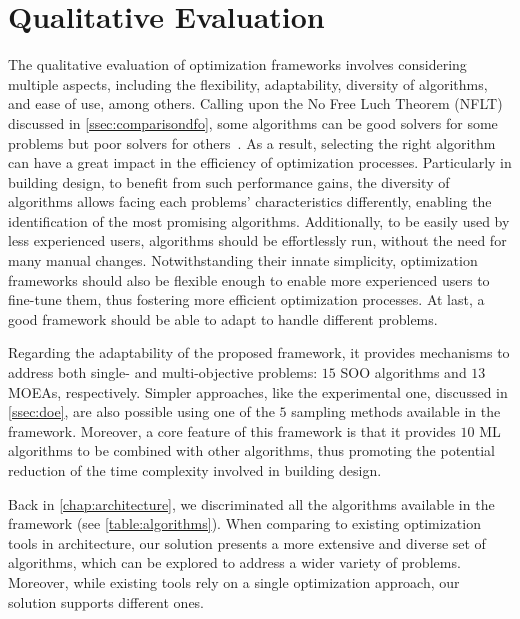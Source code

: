 \section{Qualitative Evaluation}
\label{sec:qualitative}

The qualitative evaluation of optimization frameworks involves considering multiple aspects, including the flexibility, adaptability, diversity of algorithms, and ease of use, among others. Calling upon the No Free Luch Theorem (\ac{NFLT}) discussed in \cref{ssec:comparisondfo}, some algorithms can be good solvers for some problems but poor solvers for others~\cite{Wolpert1997NFLT}. As a result, selecting the right algorithm can have a great impact in the efficiency of optimization processes. Particularly in building design, to benefit from such performance gains, the diversity of algorithms allows facing each problems' characteristics differently, enabling the identification of the most promising algorithms. Additionally, to be easily used by less experienced users, algorithms should be effortlessly run, without the need for many manual changes. Notwithstanding their innate simplicity, optimization frameworks should also be flexible enough to enable more experienced users to fine-tune them, thus fostering more efficient optimization processes. At last, a good framework should be able to adapt to handle different problems.

Regarding the adaptability of the proposed framework, it provides mechanisms to address both single- and multi-objective problems: $15$ \ac{SOO} algorithms and $13$ \acp{MOEA}, respectively. Simpler approaches, like the experimental one, discussed in \cref{ssec:doe}, are also possible using one of the $5$ sampling methods available in the framework. Moreover, a core feature of this framework is that it provides $10$ \ac{ML} algorithms to be combined with other algorithms, thus promoting the potential reduction of the time complexity involved in building design. 

Back in \cref{chap:architecture}, we discriminated all the algorithms available in the framework (see \cref{table:algorithms}). When comparing to existing optimization tools in architecture, our solution presents a more extensive and diverse set of algorithms, which can be explored to address a wider variety of problems. Moreover, while existing tools rely on a single optimization approach, our solution supports different ones.

